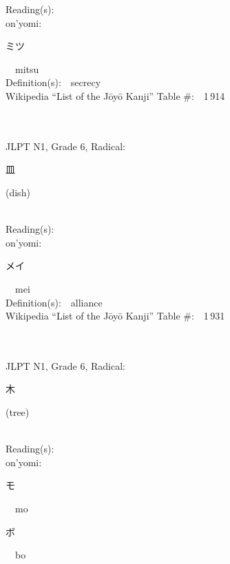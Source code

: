 \begin{multicols}{2}
Reading(s):\ \ \\
{\hspace*{1em}}on'yomi:\ \ \\
{\hspace*{2em}}{\begin{CJK}{UTF8}{min} ミツ \end{CJK}}\ \ mitsu\ \ \\
Definition(s):\ \ secrecy \\
Wikipedia ``List of the J\=oy\=o Kanji'' Table \#:\ \ 1\,914 \\
\ \ \\
{\fontsize{34pt}{40pt}  }\ \ \\  %
{JLPT N1, Grade 6, Radical:\ \ {\begin{CJK}{UTF8}{min} 皿 \end{CJK}} (dish) } \\
Reading(s):\ \ \\
{\hspace*{1em}}on'yomi:\ \ \\
{\hspace*{2em}}{\begin{CJK}{UTF8}{min} メイ \end{CJK}}\ \ mei\ \ \\
Definition(s):\ \ alliance \\
Wikipedia ``List of the J\=oy\=o Kanji'' Table \#:\ \ 1\,931 \\
\ \ \\
{\fontsize{34pt}{40pt}  }\ \ \\  %
{JLPT N1, Grade 6, Radical:\ \ {\begin{CJK}{UTF8}{min} 木 \end{CJK}} (tree) } \\
Reading(s):\ \ \\
{\hspace*{1em}}on'yomi:\ \ \\
{\hspace*{2em}}{\begin{CJK}{UTF8}{min} モ \end{CJK}}\ \ mo\ \ \\
{\hspace*{2em}}{\begin{CJK}{UTF8}{min} ボ \end{CJK}}\ \ bo\ \ \\

\end{multicols}
